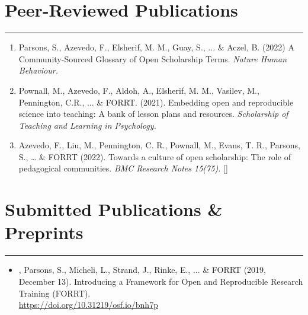 \documentclass[letterpaper]{article}
\begin{document}
\section*{\color{Brown}Peer-Reviewed Publications}
\vspace{-.5em}
\hrule
\vspace{1em}
\begin{enumerate}


\item[]{\noindent Parsons, S., {Azevedo, F.}, Elsherif, M. M., Guay, S., ... \& Aczel, B. (2022) A Community-Sourced Glossary of Open Scholarship Terms. \it{Nature Human Behaviour}.} {}

\item[]{\noindent Pownall, M., {Azevedo, F.},  Aldoh, A., Elsherif, M. M.,  Vasilev, M., Pennington, C.R., ... \& FORRT. (2021). Embedding open and reproducible science into teaching: A bank of lesson plans and resources. \it{Scholarship of Teaching and Learning in Psychology}. {}}

\item[]{\noindent Azevedo, F., Liu, M., Pennington, C. R., Pownall, M., Evans, T. R., Parsons, S., … \& FORRT (2022). Towards a culture of open scholarship: The role of pedagogical communities. \it{BMC Research Notes 15}(75).} {} [{}]

\vspace{0.25em}

\end{enumerate}


\section*{\color{Brown}Submitted Publications \& Preprints}
\vspace{-.5em}
\hrule
\vspace{1em}
\begin{itemize}
\vspace{0.25em}

\item[]{, Parsons, S., Micheli, L., Strand, J., Rinke, E., ... \& FORRT (2019, December 13). Introducing a Framework for Open and Reproducible Research Training (FORRT). \\                               \href{https://doi.org/10.31219/osf.io/bnh7p}{\color{BlueViolet}https://doi.org/10.31219/osf.io/bnh7p} {}}




\end{itemize}
\end{document}
